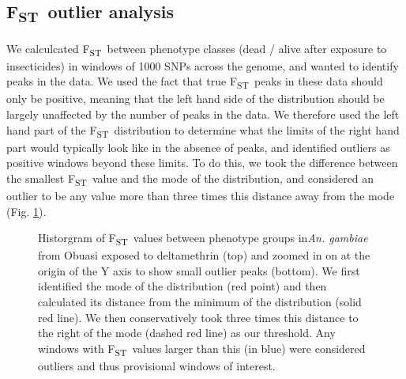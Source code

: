 \documentclass[a4paper,12pt]{article}
\newcommand{\fst}{F\textsubscript{ST}}
\begin{document}
\clearpage

\subsection{\fst\ outlier analysis}

We calculcated \fst\ between phenotype classes (dead / alive after exposure to insecticides) in windows of 1000 SNPs across the genome, and wanted to identify peaks in the data. We used the fact that true \fst\ peaks in these data should only be positive, meaning that the left hand side of the distribution should be largely unaffected by the number of peaks in the data. We therefore used the left hand part of the \fst\ distribution to determine what the limits of the right hand part would typically look like in the absence of peaks, and identified outliers as positive windows beyond these limits. To do this, we took the difference between the smallest \fst\ value and the mode of the distribution, and considered an outlier to be any value more than three times this distance away from the mode (Fig. \ref{FigM5}).


\begin{figure}[h]
	\hspace*{-1cm}
	\begin{minipage}{\textwidth}
		\begin{center}
		\end{center}
	\end{minipage}
	\caption{\footnotesize Historgram of \fst\ values between phenotype groups in\textit{An. gambiae} from Obuasi exposed to deltamethrin (top) and zoomed in on at the origin of the Y axis to show small outlier peaks (bottom). We first identified the mode of the distribution (red point) and then calculated its distance from the minimum of the distribution (solid red line). We then conservatively took three times this distance to the right of the mode (dashed red line) as our threshold. Any windows with \fst\ values larger than this (in blue) were considered outliers and thus provisional windows of interest.}
	\label{FigM5}
\end{figure}
\end{document}
